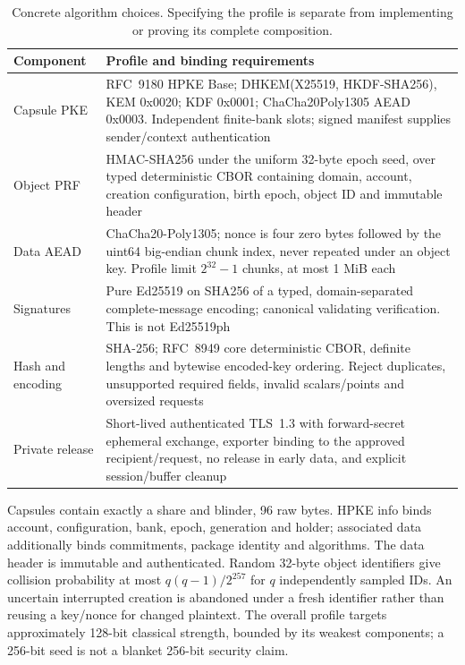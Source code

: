 \documentclass[pdflatex,sn-mathphys-num]{sn-jnl}
\theoremstyle{plain}
\theoremstyle{definition}
\begin{document}
\begin{table}[htbp]
\caption{Concrete algorithm choices. Specifying the profile is separate from implementing or proving its complete composition.}\label{tab:profile}
\centering\footnotesize
\begin{tabularx}{\linewidth}{@{}p{.24\linewidth}Y@{}}\toprule
Component & Profile and binding requirements\\\midrule
Capsule PKE & RFC~9180 HPKE Base; DHKEM(X25519, HKDF-SHA256), KEM 0x0020; KDF 0x0001; ChaCha20Poly1305 AEAD 0x0003. Independent finite-bank slots; signed manifest supplies sender/context authentication~\cite{rfc9180}\\
Object PRF & HMAC-SHA256 under the uniform 32-byte epoch seed, over typed deterministic CBOR containing domain, account, creation configuration, birth epoch, object ID and immutable header\\
Data AEAD & ChaCha20-Poly1305; nonce is four zero bytes followed by the uint64 big-endian chunk index, never repeated under an object key. Profile limit $2^{32}-1$ chunks, at most 1 MiB each~\cite{rfc8439}\\
Signatures & Pure Ed25519 on SHA256 of a typed, domain-separated complete-message encoding; canonical validating verification. This is not Ed25519ph~\cite{rfc8032}\\
Hash and encoding & SHA-256; RFC~8949 core deterministic CBOR, definite lengths and bytewise encoded-key ordering. Reject duplicates, unsupported required fields, invalid scalars/points and oversized requests~\cite{rfc8949}\\
Private release & Short-lived authenticated TLS~1.3 with forward-secret ephemeral exchange, exporter binding to the approved recipient/request, no release in early data, and explicit session/buffer cleanup~\cite{rfc8446}\\\bottomrule
\end{tabularx}
\end{table}

Capsules contain exactly a share and blinder, 96 raw bytes. HPKE info binds account, configuration, bank, epoch, generation and holder; associated data additionally binds commitments, package identity and algorithms. The data header is immutable and authenticated. Random 32-byte object identifiers give collision probability at most $q(q-1)/2^{257}$ for $q$ independently sampled IDs. An uncertain interrupted creation is abandoned under a fresh identifier rather than reusing a key/nonce for changed plaintext. The overall profile targets approximately 128-bit classical strength, bounded by its weakest components; a 256-bit seed is not a blanket 256-bit security claim.
\end{document}
